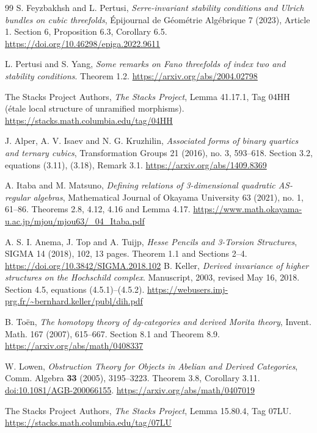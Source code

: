 \documentclass[a4paper,11pt]{ltjsarticle}
\theoremstyle{definition}
\begin{document}
\begin{thebibliography}{99}
S. Feyzbakhsh and L. Pertusi,
\emph{Serre-invariant stability conditions and Ulrich bundles on cubic threefolds},
\'Epijournal de G\'eom\'etrie Alg\'ebrique 7 (2023), Article 1.
Section 6, Proposition 6.3, Corollary 6.5.
\url{https://doi.org/10.46298/epiga.2022.9611}

L. Pertusi and S. Yang,
\emph{Some remarks on Fano threefolds of index two and stability conditions}.
Theorem 1.2.
\url{https://arxiv.org/abs/2004.02798}

The Stacks Project Authors,
\emph{The Stacks Project},
Lemma 41.17.1, Tag 04HH (\'etale local structure of unramified morphisms).
\url{https://stacks.math.columbia.edu/tag/04HH}

J. Alper, A. V. Isaev and N. G. Kruzhilin,
\emph{Associated forms of binary quartics and ternary cubics},
Transformation Groups 21 (2016), no. 3, 593--618.
Section 3.2, equations (3.11), (3.18), Remark 3.1.
\url{https://arxiv.org/abs/1409.8369}

A. Itaba and M. Matsuno,
\emph{Defining relations of 3-dimensional quadratic AS-regular algebras},
Mathematical Journal of Okayama University 63 (2021), no. 1, 61--86.
Theorems 2.8, 4.12, 4.16 and Lemma 4.17.
\url{https://www.math.okayama-u.ac.jp/mjou/mjou63/_04_Itaba.pdf}

A. S. I. Anema, J. Top and A. Tuijp,
\emph{Hesse Pencils and 3-Torsion Structures},
SIGMA 14 (2018), 102, 13 pages.
Theorem 1.1 and Sections 2--4.
\url{https://doi.org/10.3842/SIGMA.2018.102}
B. Keller,
\emph{Derived invariance of higher structures on the Hochschild complex}.
Manuscript, 2003, revised May 16, 2018.
Section 4.5, equations (4.5.1)--(4.5.2).
\url{https://webusers.imj-prg.fr/~bernhard.keller/publ/dih.pdf}

B. To\"en,
\emph{The homotopy theory of dg-categories and derived Morita theory},
Invent. Math. 167 (2007), 615--667.
Section 8.1 and Theorem 8.9.
\url{https://arxiv.org/abs/math/0408337}

W. Lowen,
\emph{Obstruction Theory for Objects in Abelian and Derived Categories},
Comm. Algebra \textbf{33} (2005), 3195--3223.
Theorem 3.8, Corollary 3.11.
\href{https://doi.org/10.1081/AGB-200066155}{doi:10.1081/AGB-200066155}.
\url{https://arxiv.org/abs/math/0407019}

The Stacks Project Authors,
\emph{The Stacks Project}, Lemma 15.80.4, Tag 07LU.
\url{https://stacks.math.columbia.edu/tag/07LU}


\end{thebibliography}
\end{document}
